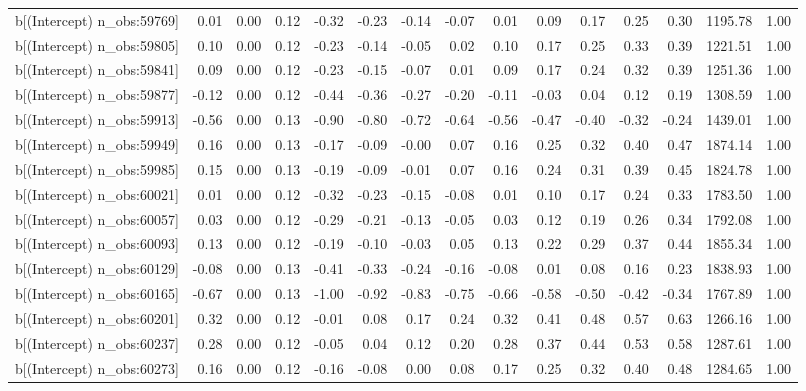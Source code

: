 \begin{table}[ht]
\begin{tabular}{rrrrrrrrrrrrrrr}
  b[(Intercept) n\_obs:59769] & 0.01 & 0.00 & 0.12 & -0.32 & -0.23 & -0.14 & -0.07 & 0.01 & 0.09 & 0.17 & 0.25 & 0.30 & 1195.78 & 1.00 \\ 
  b[(Intercept) n\_obs:59805] & 0.10 & 0.00 & 0.12 & -0.23 & -0.14 & -0.05 & 0.02 & 0.10 & 0.17 & 0.25 & 0.33 & 0.39 & 1221.51 & 1.00 \\ 
  b[(Intercept) n\_obs:59841] & 0.09 & 0.00 & 0.12 & -0.23 & -0.15 & -0.07 & 0.01 & 0.09 & 0.17 & 0.24 & 0.32 & 0.39 & 1251.36 & 1.00 \\ 
  b[(Intercept) n\_obs:59877] & -0.12 & 0.00 & 0.12 & -0.44 & -0.36 & -0.27 & -0.20 & -0.11 & -0.03 & 0.04 & 0.12 & 0.19 & 1308.59 & 1.00 \\ 
  b[(Intercept) n\_obs:59913] & -0.56 & 0.00 & 0.13 & -0.90 & -0.80 & -0.72 & -0.64 & -0.56 & -0.47 & -0.40 & -0.32 & -0.24 & 1439.01 & 1.00 \\ 
  b[(Intercept) n\_obs:59949] & 0.16 & 0.00 & 0.13 & -0.17 & -0.09 & -0.00 & 0.07 & 0.16 & 0.25 & 0.32 & 0.40 & 0.47 & 1874.14 & 1.00 \\ 
  b[(Intercept) n\_obs:59985] & 0.15 & 0.00 & 0.13 & -0.19 & -0.09 & -0.01 & 0.07 & 0.16 & 0.24 & 0.31 & 0.39 & 0.45 & 1824.78 & 1.00 \\ 
  b[(Intercept) n\_obs:60021] & 0.01 & 0.00 & 0.12 & -0.32 & -0.23 & -0.15 & -0.08 & 0.01 & 0.10 & 0.17 & 0.24 & 0.33 & 1783.50 & 1.00 \\ 
  b[(Intercept) n\_obs:60057] & 0.03 & 0.00 & 0.12 & -0.29 & -0.21 & -0.13 & -0.05 & 0.03 & 0.12 & 0.19 & 0.26 & 0.34 & 1792.08 & 1.00 \\ 
  b[(Intercept) n\_obs:60093] & 0.13 & 0.00 & 0.12 & -0.19 & -0.10 & -0.03 & 0.05 & 0.13 & 0.22 & 0.29 & 0.37 & 0.44 & 1855.34 & 1.00 \\ 
  b[(Intercept) n\_obs:60129] & -0.08 & 0.00 & 0.13 & -0.41 & -0.33 & -0.24 & -0.16 & -0.08 & 0.01 & 0.08 & 0.16 & 0.23 & 1838.93 & 1.00 \\ 
  b[(Intercept) n\_obs:60165] & -0.67 & 0.00 & 0.13 & -1.00 & -0.92 & -0.83 & -0.75 & -0.66 & -0.58 & -0.50 & -0.42 & -0.34 & 1767.89 & 1.00 \\ 
  b[(Intercept) n\_obs:60201] & 0.32 & 0.00 & 0.12 & -0.01 & 0.08 & 0.17 & 0.24 & 0.32 & 0.41 & 0.48 & 0.57 & 0.63 & 1266.16 & 1.00 \\ 
  b[(Intercept) n\_obs:60237] & 0.28 & 0.00 & 0.12 & -0.05 & 0.04 & 0.12 & 0.20 & 0.28 & 0.37 & 0.44 & 0.53 & 0.58 & 1287.61 & 1.00 \\ 
  b[(Intercept) n\_obs:60273] & 0.16 & 0.00 & 0.12 & -0.16 & -0.08 & 0.00 & 0.08 & 0.17 & 0.25 & 0.32 & 0.40 & 0.48 & 1284.65 & 1.00 \\ 

\end{tabular}
\end{table}
